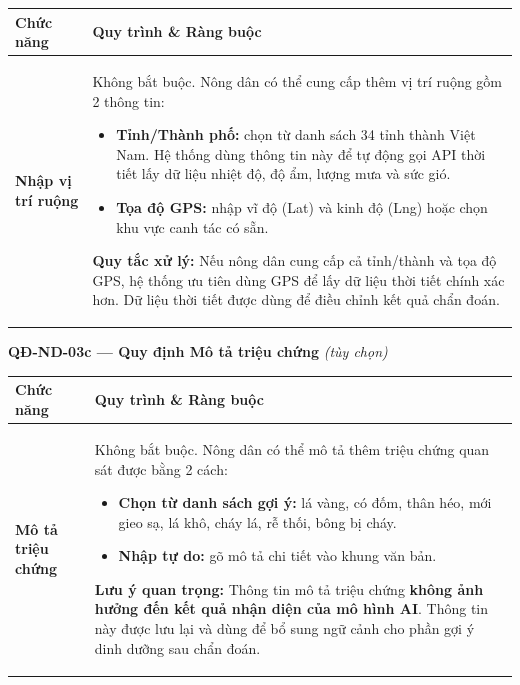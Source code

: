 \documentclass[12pt,a4paper]{article}
\begin{document}
\begin{longtable}{|
    >{\raggedright\arraybackslash}p{2.8cm}|
    >{\raggedright\arraybackslash}p{12cm}|}
\hline
\rowcolor{headerblue}
\textbf{Chức năng} & \textbf{Quy trình \& Ràng buộc} \\
\hline
\endhead
\textbf{Nhập vị trí ruộng} &
Không bắt buộc. Nông dân có thể cung cấp thêm vị trí ruộng gồm 2 thông tin:
\begin{itemize}[leftmargin=*,topsep=2pt,itemsep=1pt]
    \item \textbf{Tỉnh/Thành phố:} chọn từ danh sách 34 tỉnh thành Việt Nam. Hệ thống dùng thông tin này để tự động gọi API thời tiết lấy dữ liệu nhiệt độ, độ ẩm, lượng mưa và sức gió.
    \item \textbf{Tọa độ GPS:} nhập vĩ độ (Lat) và kinh độ (Lng) hoặc chọn khu vực canh tác có sẵn.
\end{itemize}
\textbf{Quy tắc xử lý:} Nếu nông dân cung cấp cả tỉnh/thành và tọa độ GPS, hệ thống ưu tiên dùng GPS để lấy dữ liệu thời tiết chính xác hơn. Dữ liệu thời tiết được dùng để điều chỉnh kết quả chẩn đoán. \\
\hline
\end{longtable}
 
\vspace{0.3cm}
\noindent\textbf{QĐ-ND-03c --- Quy định Mô tả triệu chứng} \textit{(tùy chọn)}
 
\begin{longtable}{|
    >{\raggedright\arraybackslash}p{2.8cm}|
    >{\raggedright\arraybackslash}p{12cm}|}
\hline
\rowcolor{headerblue}
\textbf{Chức năng} & \textbf{Quy trình \& Ràng buộc} \\
\hline
\endhead
\textbf{Mô tả triệu chứng} &
Không bắt buộc. Nông dân có thể mô tả thêm triệu chứng quan sát được bằng 2 cách:
\begin{itemize}[leftmargin=*,topsep=2pt,itemsep=1pt]
    \item \textbf{Chọn từ danh sách gợi ý:} lá vàng, có đốm, thân héo, mới gieo sạ, lá khô, cháy lá, rễ thối, bông bị cháy.
    \item \textbf{Nhập tự do:} gõ mô tả chi tiết vào khung văn bản.
\end{itemize}
\textbf{Lưu ý quan trọng:} Thông tin mô tả triệu chứng \textbf{không ảnh hưởng đến kết quả nhận diện của mô hình AI}. Thông tin này được lưu lại và dùng để bổ sung ngữ cảnh cho phần gợi ý dinh dưỡng sau chẩn đoán. \\
\hline
\end{longtable}
 
\end{document}
